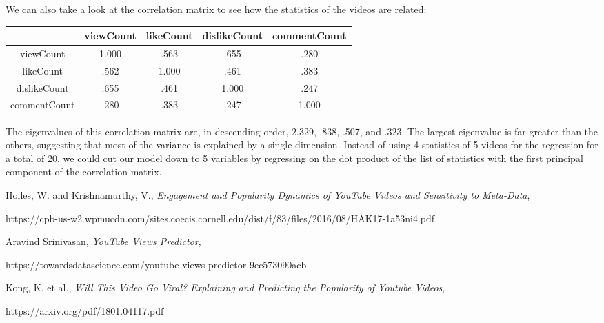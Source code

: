 \documentclass[12pt]{article}
\theoremstyle{definition}
\theoremstyle{remark}
\begin{document}
We can also take a look at the correlation matrix to see how the statistics of
the videos are related:


\begin{center}
\begin{tabular}{ |c|c|c|c|c| } 
 \hline
 & viewCount & likeCount & dislikeCount & commentCount\\ 
 \hline
 viewCount & 1.000 & .563 & .655 & .280 \\ 
 \hline
 likeCount & .562 & 1.000 & .461 & .383 \\ 
 \hline
 dislikeCount & .655 & .461 & 1.000 & .247 \\ 
 \hline 
 commentCount & .280 & .383 & .247 & 1.000 \\ 
 \hline
\end{tabular}
\end{center}

The eigenvalues of this correlation matrix are, in descending order, 2.329,
.838, .507, and .323. The largest eigenvalue is far greater than the others,
suggesting that most of the variance is explained by a single dimension.
Instead of using 4 statistics of 5 videos for the regression for a total of 20,
we could cut our model down to 5 variables by regressing on the dot product of
the list of statistics with the first principal component of the correlation matrix.

\begin{thebibliography}{99}

 Hoiles, W. and Krishnamurthy, V., \emph{Engagement and Popularity Dynamics of
YouTube Videos and Sensitivity to Meta-Data}, 

    \qquad https://cpb-us-w2.wpmucdn.com/sites.coecis.cornell.edu/dist/f/83/files/2016/08/HAK17-1a53ni4.pdf

 Aravind Srinivasan, \emph{YouTube Views Predictor}, 

    \qquad https://towardsdatascience.com/youtube-views-predictor-9ec573090acb

 Kong, K. et al., \emph{Will This Video Go Viral? Explaining and Predicting the
Popularity of Youtube Videos}, 

    \qquad https://arxiv.org/pdf/1801.04117.pdf



\end{thebibliography}
\end{document}
